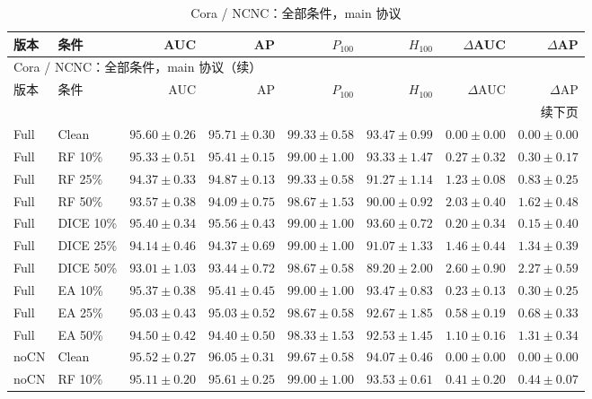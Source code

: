 {\footnotesize
\setlength{\tabcolsep}{3.2pt}
\renewcommand{\arraystretch}{1.10}
\begin{longtable}{llrrrrrr}
\caption{Cora / NCNC：全部条件，main 协议}\\
\toprule
版本 & 条件 & AUC & AP & $P_{100}$ & $H_{100}$ & $\Delta$AUC & $\Delta$AP \\
\midrule
\endfirsthead
\multicolumn{8}{l}{Cora / NCNC：全部条件，main 协议（续）}\\
\toprule
版本 & 条件 & AUC & AP & $P_{100}$ & $H_{100}$ & $\Delta$AUC & $\Delta$AP \\
\midrule
\endhead
\midrule\multicolumn{8}{r}{续下页}\\
\endfoot
\bottomrule
\endlastfoot
Full & Clean & $95.60\pm0.26$ & $95.71\pm0.30$ & $99.33\pm0.58$ & $93.47\pm0.99$ & $0.00\pm0.00$ & $0.00\pm0.00$ \\
Full & RF 10\% & $95.33\pm0.51$ & $95.41\pm0.15$ & $99.00\pm1.00$ & $93.33\pm1.47$ & $0.27\pm0.32$ & $0.30\pm0.17$ \\
Full & RF 25\% & $94.37\pm0.33$ & $94.87\pm0.13$ & $99.33\pm0.58$ & $91.27\pm1.14$ & $1.23\pm0.08$ & $0.83\pm0.25$ \\
Full & RF 50\% & $93.57\pm0.38$ & $94.09\pm0.75$ & $98.67\pm1.53$ & $90.00\pm0.92$ & $2.03\pm0.40$ & $1.62\pm0.48$ \\
Full & DICE 10\% & $95.40\pm0.34$ & $95.56\pm0.43$ & $99.00\pm1.00$ & $93.60\pm0.72$ & $0.20\pm0.34$ & $0.15\pm0.40$ \\
Full & DICE 25\% & $94.14\pm0.46$ & $94.37\pm0.69$ & $99.00\pm1.00$ & $91.07\pm1.33$ & $1.46\pm0.44$ & $1.34\pm0.39$ \\
Full & DICE 50\% & $93.01\pm1.03$ & $93.44\pm0.72$ & $98.67\pm0.58$ & $89.20\pm2.00$ & $2.60\pm0.90$ & $2.27\pm0.59$ \\
Full & EA 10\% & $95.37\pm0.38$ & $95.41\pm0.45$ & $99.00\pm1.00$ & $93.47\pm0.83$ & $0.23\pm0.13$ & $0.30\pm0.25$ \\
Full & EA 25\% & $95.03\pm0.43$ & $95.03\pm0.52$ & $98.67\pm0.58$ & $92.67\pm1.85$ & $0.58\pm0.19$ & $0.68\pm0.33$ \\
Full & EA 50\% & $94.50\pm0.42$ & $94.40\pm0.50$ & $98.33\pm1.53$ & $92.53\pm1.45$ & $1.10\pm0.16$ & $1.31\pm0.34$ \\
noCN & Clean & $95.52\pm0.27$ & $96.05\pm0.31$ & $99.67\pm0.58$ & $94.07\pm0.46$ & $0.00\pm0.00$ & $0.00\pm0.00$ \\
noCN & RF 10\% & $95.11\pm0.20$ & $95.61\pm0.25$ & $99.00\pm1.00$ & $93.53\pm0.61$ & $0.41\pm0.20$ & $0.44\pm0.07$ \\

\end{longtable}}
